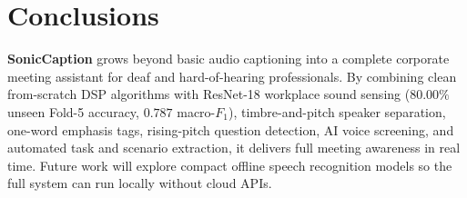 \documentclass[letterpaper,12pt]{article}
\begin{document}
\section{Conclusions}
\textbf{SonicCaption} grows beyond basic audio captioning into a complete corporate meeting assistant for deaf and hard-of-hearing professionals. By combining clean from-scratch DSP algorithms with ResNet-18 workplace sound sensing ($80.00\%$ unseen Fold-5 accuracy, $0.787$ macro-$F_1$), timbre-and-pitch speaker separation, one-word emphasis tags, rising-pitch question detection, AI voice screening, and automated task and scenario extraction, it delivers full meeting awareness in real time. Future work will explore compact offline speech recognition models so the full system can run locally without cloud APIs.



\end{document}
